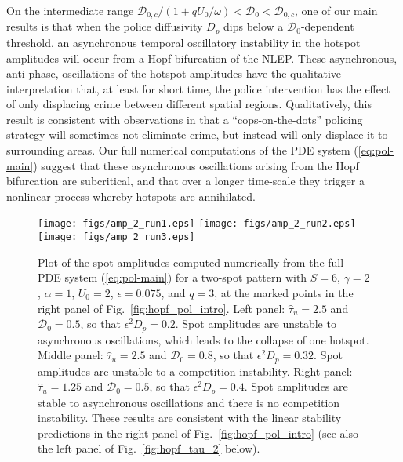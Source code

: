 \documentclass{article}%
\begin{document}
On the intermediate range ${\mathcal
  D}_{0,c}/(1+qU_0/\omega)<{\mathcal D}_0<{\mathcal D}_{0,c}$, one of
our main results is that when the police diffusivity $D_p$ dips below
a ${\mathcal D}_0$-dependent threshold, an asynchronous temporal
oscillatory instability in the hotspot amplitudes will occur from a
Hopf bifurcation of the NLEP. These asynchronous, anti-phase,
oscillations of the hotspot amplitudes have the qualitative
interpretation that, at least for short time, the police intervention
has the effect of only displacing crime between different spatial
regions.  Qualitatively, this result is consistent with observations
in \cite{braga} that a ``cops-on-the-dots'' policing strategy will
sometimes not eliminate crime, but instead will only displace it to
surrounding areas. Our full numerical computations of the PDE system
(\ref{eq:pol-main}) suggest that these asynchronous oscillations
arising from the Hopf bifurcation are subcritical, and that over a
longer time-scale they trigger a nonlinear process whereby hotspots
are annihilated.

\begin{figure}[htbp]
\centering
\texttt{[image: figs/amp\_2\_run1.eps]}
\texttt{[image: figs/amp\_2\_run2.eps]}
\texttt{[image: figs/amp\_2\_run3.eps]}
\caption{\label{fig:valid_2spot_q3} Plot of the spot amplitudes
  computed numerically from the full PDE system (\ref{eq:pol-main})
  for a two-spot pattern with $S=6$, $\gamma=2$, $\alpha=1$, $U_0=2$,
  $\epsilon=0.075$, and $q=3$, at the marked points in the right panel of
  Fig.~\ref{fig:hopf_pol_intro}.  Left panel: $\hat{\tau}_u=2.5$ and
  ${\mathcal D}_0=0.5$, so that $\epsilon^2 D_p=0.2$. Spot amplitudes
  are unstable to asynchronous oscillations, which leads to the
  collapse of one hotspot.  Middle panel: $\hat{\tau}_u=2.5$ and
  ${\mathcal D}_0=0.8$, so that $\epsilon^2 D_p=0.32$. Spot amplitudes
  are unstable to a competition instability. Right panel:
  $\hat{\tau}_u=1.25$ and ${\mathcal D}_0=0.5$, so that
  $\epsilon^2D_p=0.4$. Spot amplitudes are stable to asynchronous
  oscillations and there is no competition instability.  These results
  are consistent with the linear stability predictions in the right
  panel of Fig.~\ref{fig:hopf_pol_intro} (see also the left panel of
  Fig.~\ref{fig:hopf_tau_2} below).}
\end{figure}
\end{document}
